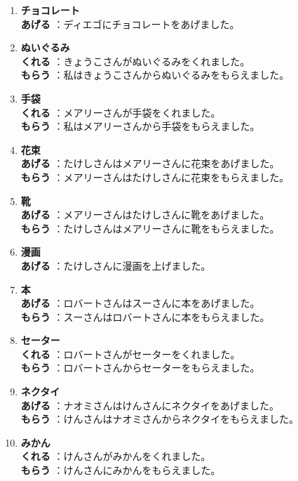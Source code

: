 \documentclass[notoc,notitlepage]{tufte-book}
\begin{document}
\begin{ex}
\begin{enumerate}
    \item \textbf{チョコレート} \\
      \textbf{あげる} ：ディエゴにチョコレートをあげました。

    \item \textbf{ぬいぐるみ} \\
      \textbf{くれる} ：きょうこさんがぬいぐるみをくれました。\\
      \textbf{もらう} ：私はきょうこさんからぬいぐるみをもらえました。

    \item \textbf{手袋} \\
      \textbf{くれる} ：メアリーさんが手袋をくれました。\\
      \textbf{もらう} ：私はメアリーさんから手袋をもらえました。

    \item \textbf{花束} \\
      \textbf{あげる} ：たけしさんはメアリーさんに花束をあげました。\\
      \textbf{もらう} ：メアリーさんはたけしさんに花束をもらえました。
    
    \item \textbf{靴} \\
      \textbf{あげる} ：メアリーさんはたけしさんに靴をあげました。\\
      \textbf{もらう} ：たけしさんはメアリーさんに靴をもらえました。

    \item \textbf{漫画} \\
      \textbf{あげる} ：たけしさんに漫画を上げました。\\

    \item \textbf{本} \\
      \textbf{あげる} ：ロバートさんはスーさんに本をあげました。\\
      \textbf{もらう} ：スーさんはロバートさんに本をもらえました。

    \item \textbf{セーター} \\
      \textbf{くれる} ：ロバートさんがセーターをくれました。\\
      \textbf{もらう} ：ロバートさんからセーターをもらえました。

    \item \textbf{ネクタイ} \\
      \textbf{あげる} ：ナオミさんはけんさんにネクタイをあげました。\\
      \textbf{もらう} ：けんさんはナオミさんからネクタイをもらえました。

    \item \textbf{みかん} \\
      \textbf{くれる} ：けんさんがみかんをくれました。\\
      \textbf{もらう} ：けんさんにみかんをもらえました。
  \end{enumerate}
\end{ex}
\end{document}
